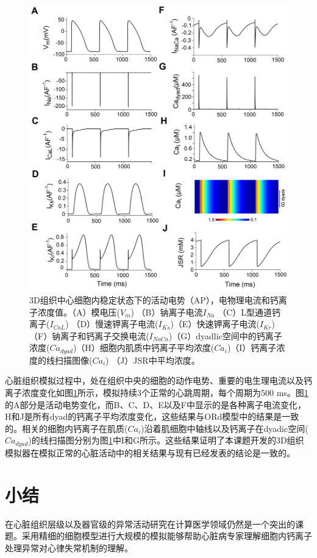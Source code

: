 \begin{figure}
 \includegraphics[width=\linewidth]{figs/cell_variables.png}
 \caption{3D组织中心细胞内稳定状态下的活动电势（AP），电物理电流和钙离子浓度值。（A）模电压($V_m$) （B）钠离子电流$I_{Na}$ （C）L型通道钙离子($I_{CaL}$) （D）慢速钾离子电流($I_{Ks}$)（E）快速钾离子电流($I_{Kr}$)（F）钠离子和钙离子交换电流($I_{NaCa}$)（G）dyadlic空间中的钙离子浓度($Ca_{dyad}$)（H）细胞内肌质中钙离子平均浓度($Ca_i$)（I）钙离子浓度的线扫描图像($Ca_i$) （J）JSR中平均浓度。}
 \label{fig:calcium}
\end{figure}

心脏组织模拟过程中，处在组织中央的细胞的动作电势、重要的电生理电流以及钙离子浓度变化如图\ref{fig:calcium}所示，模拟持续3个正常的心跳周期，每个周期为500 ms。图\ref{fig:calcium}的A部分是活动电势变化，而B、C、D、E以及F中显示的是各种离子电流变化，H和J是所有dyad的钙离子平均浓度变化，这些结果与ORd模型中的结果是一致的。相关的细胞内钙离子在肌质($Ca_i$)沿着肌细胞中轴线以及钙离子在dyadic空间($Ca_{dyad}$)的线扫描图分别为图\ref{fig:calcium}中I和G所示。这些结果证明了本课题开发的3D组织模拟器在模拟正常的心脏活动中的相关结果与现有已经发表的结论是一致的。

\section{小结}
在心脏组织层级以及器官级的异常活动研究在计算医学领域仍然是一个突出的课题。采用精细的细胞模型进行大规模的模拟能够帮助心脏病专家理解细胞内钙离子处理异常对心律失常机制的理解。

